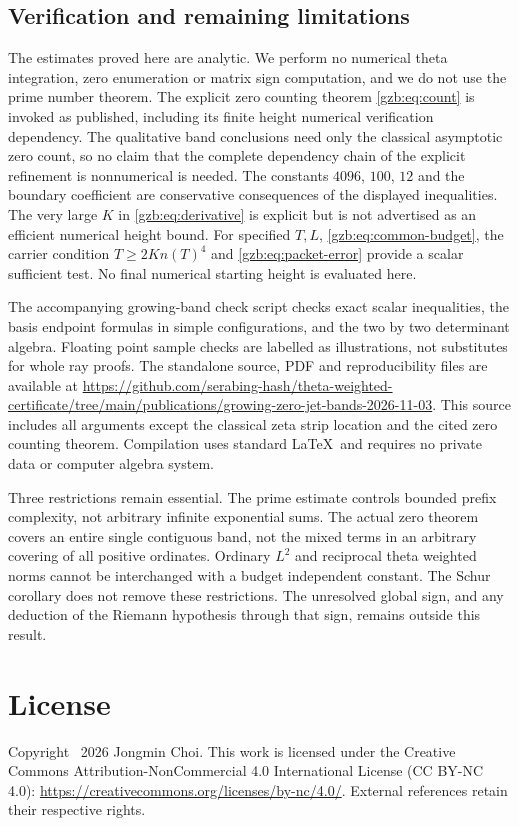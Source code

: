 \documentclass[11pt,a4paper]{article}
\numberwithin{equation}{section}
\theoremstyle{definition}\newtheorem{definition}[theorem]{Definition}
\theoremstyle{remark}\newtheorem{remark}[theorem]{Remark}
\begin{document}
\subsection{Verification and remaining limitations}
The estimates proved here are analytic. We perform no numerical theta
integration, zero enumeration or matrix sign computation, and we do not
use the prime number theorem. The explicit zero counting theorem
\eqref{gzb:eq:count} is invoked as published, including its finite height
numerical verification dependency. The qualitative band conclusions need
only the classical asymptotic zero count, so no claim that the complete
dependency chain of the explicit refinement is nonnumerical is needed.
The constants $4096$, $100$, $12$ and the boundary coefficient are
conservative consequences of the displayed inequalities.
The very large $K$ in \eqref{gzb:eq:derivative} is explicit but is not
advertised as an efficient numerical height bound.
For specified $T,L$, \eqref{gzb:eq:common-budget}, the carrier condition
$T\ge2Kn(T)^4$ and \eqref{gzb:eq:packet-error} provide a scalar sufficient
test. No final numerical starting height is evaluated here.

The accompanying growing-band check script checks exact scalar inequalities, the basis
endpoint formulas in simple configurations, and the two by two determinant
algebra. Floating point sample checks are labelled as illustrations,
not substitutes for whole ray proofs.
The standalone source, PDF and reproducibility files are available at
\url{https://github.com/serabing-hash/theta-weighted-certificate/tree/main/publications/growing-zero-jet-bands-2026-11-03}.
This source includes all arguments except the classical zeta strip
location and the cited zero counting theorem. Compilation uses standard \LaTeX\ and requires no
private data or computer algebra system.

Three restrictions remain essential. The prime estimate controls bounded
prefix complexity, not arbitrary infinite exponential sums.
The actual zero theorem covers an entire single contiguous band, not
the mixed terms in an arbitrary covering of all positive ordinates.
Ordinary $L^2$ and reciprocal theta weighted norms cannot be interchanged
with a budget independent constant. The Schur corollary does not remove
these restrictions. The unresolved global sign, and any deduction of
the Riemann hypothesis through that sign, remains outside this result.


\section*{License}
Copyright \textcopyright\ 2026 Jongmin Choi. This work is licensed under the Creative Commons Attribution-NonCommercial 4.0 International License (CC BY-NC 4.0): \url{https://creativecommons.org/licenses/by-nc/4.0/}. External references retain their respective rights.
\end{document}
